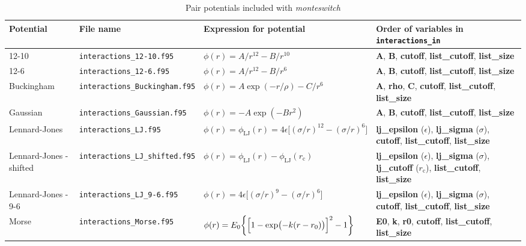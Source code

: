 \documentclass{report}
\begin{document}
\begin{landscape}
\begin{center}\label{table:pair_potentials}
\begin{longtable}{ l l l p{5cm} }
\caption{Pair potentials included with \emph{monteswitch}}
\\
Potential & File name & Expression for potential & Order of variables in \texttt{interactions\_in}  \\

\hline

12-10 & \texttt{interactions\_12-10.f95} & $\phi(r)=A/r^{12}-B/r^{10}$ 
& \textbf{A}, \textbf{B}, \textbf{cutoff}, \textbf{list\_cutoff}, \textbf{list\_size} \\

12-6  &  \texttt{interactions\_12-6.f95} & $\phi(r)=A/r^{12}-B/r^{6}$ 
& \textbf{A}, \textbf{B}, \textbf{cutoff}, \textbf{list\_cutoff}, \textbf{list\_size} \\

Buckingham & \texttt{interactions\_Buckingham.f95} & $\phi(r)=A\exp(-r/\rho)-C/r^6$ 
& \textbf{A}, \textbf{rho}, \textbf{C}, \textbf{cutoff}, \textbf{list\_cutoff}, \textbf{list\_size} \\

Gaussian & \texttt{interactions\_Gaussian.f95} & $\phi(r)=-A\exp(-Br^2)$ 
& \textbf{A}, \textbf{B}, \textbf{cutoff}, \textbf{list\_cutoff}, \textbf{list\_size} \\

Lennard-Jones & \texttt{interactions\_LJ.f95} & $\phi(r)=\phi_{\text{LJ}}(r)=4\epsilon\bigl[(\sigma/r)^{12}-(\sigma/r)^6\bigr]$
& \textbf{lj\_epsilon} ($\epsilon$), \textbf{lj\_sigma} ($\sigma$), \textbf{cutoff}, \textbf{list\_cutoff}, \textbf{list\_size} \\

Lennard-Jones - shifted  & \texttt{interactions\_LJ\_shifted.f95} & $\phi(r)=\phi_{\text{LJ}}(r)-\phi_{\text{LJ}}(r_{\text{c}})$ 
& \textbf{lj\_epsilon} ($\epsilon$), \textbf{lj\_sigma} ($\sigma$), \textbf{lj\_cutoff} ($r_{\text{c}}$), \textbf{list\_cutoff}, \textbf{list\_size} \\

Lennard-Jones - 9-6 & \texttt{interactions\_LJ\_9-6.f95} & $\phi(r)=4\epsilon\bigl[(\sigma/r)^9-(\sigma/r)^6\bigr]$
& \textbf{lj\_epsilon} ($\epsilon$), \textbf{lj\_sigma} ($\sigma$), \textbf{cutoff}, \textbf{list\_cutoff}, \textbf{list\_size} \\

Morse & \texttt{interactions\_Morse.f95} & $\phi(r)=E_0\bigg\lbrace \Bigl[1-\exp\bigl(-k(r-r_0)\bigr)\Bigr]^2 -1 \biggr\rbrace$ 
& \textbf{E0}, \textbf{k}, \textbf{r0}, \textbf{cutoff}, \textbf{list\_cutoff}, \textbf{list\_size} \\


\end{longtable}
\end{center}
\end{landscape}
\end{document}
